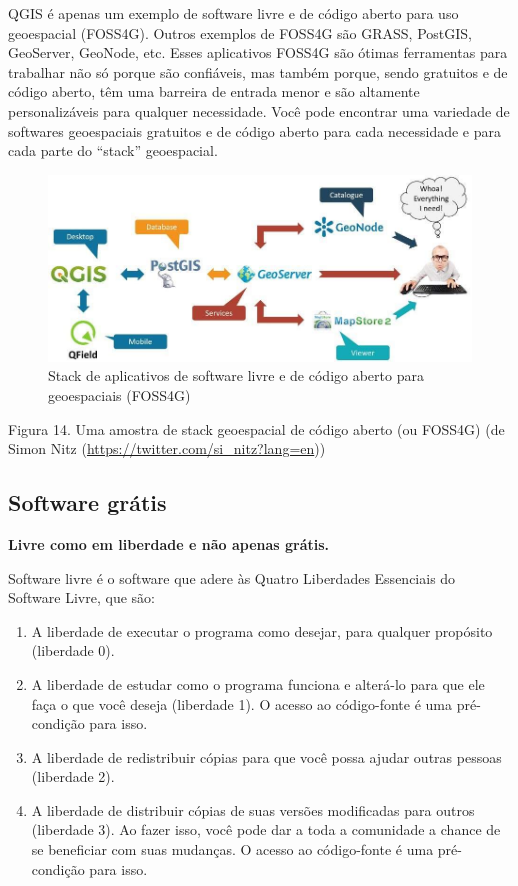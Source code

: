\documentclass[
]{krantz}
\providecommand{\tightlist}{%
  \setlength{\itemsep}{0pt}\setlength{\parskip}{0pt}}
\begin{document}
QGIS é apenas um exemplo de software livre e de código aberto para uso geoespacial (FOSS4G). Outros exemplos de FOSS4G são GRASS, PostGIS, GeoServer, GeoNode, etc. Esses aplicativos FOSS4G são ótimas ferramentas para trabalhar não só porque são confiáveis, mas também porque, sendo gratuitos e de código aberto, têm uma barreira de entrada menor e são altamente personalizáveis para qualquer necessidade. Você pode encontrar uma variedade de softwares geoespaciais gratuitos e de código aberto para cada necessidade e para cada parte do ``stack'' geoespacial.

\begin{figure}
\centering
\includegraphics{media/modulo0/foss4g-stack.jpeg}
\caption{Stack de aplicativos de software livre e de código aberto para geoespaciais (FOSS4G)}
\end{figure}

Figura 14. Uma amostra de stack geoespacial de código aberto (ou FOSS4G) (de Simon Nitz (\url{https://twitter.com/si_nitz?lang=en}))

\hypertarget{software-gruxe1tis}{%
\subsection{Software grátis}\label{software-gruxe1tis}}

\textbf{Livre como em liberdade e não apenas grátis.}

Software livre é o software que adere às Quatro Liberdades Essenciais do Software Livre, que são:

\begin{enumerate}
\def\labelenumi{\arabic{enumi}.}
\tightlist
\item
  A liberdade de executar o programa como desejar, para qualquer propósito (liberdade 0).
\item
  A liberdade de estudar como o programa funciona e alterá-lo para que ele faça o que você deseja (liberdade 1). O acesso ao código-fonte é uma pré-condição para isso.
\item
  A liberdade de redistribuir cópias para que você possa ajudar outras pessoas (liberdade 2).
\item
  A liberdade de distribuir cópias de suas versões modificadas para outros (liberdade 3). Ao fazer isso, você pode dar a toda a comunidade a chance de se beneficiar com suas mudanças. O acesso ao código-fonte é uma pré-condição para isso.
\end{enumerate}
\end{document}
